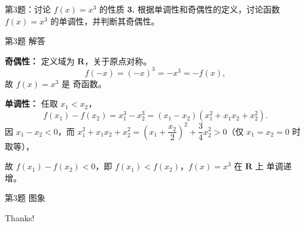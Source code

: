 \documentclass[10pt,aspectratio=169,serif]{beamer}
\begin{document}
\begin{frame}[t]{第3题：讨论 $f(x)=x^3$ 的性质}
\textbf{3.} 根据单调性和奇偶性的定义，讨论函数 $f(x)=x^3$ 的单调性，并判断其奇偶性。
\end{frame}

\begin{frame}[t]{第3题 解答}
\begin{tcolorbox}[colback=orange!10,colframe=orange,title=\textbf{解}]
\textbf{奇偶性：} 定义域为 $\mathbf{R}$，关于原点对称。
\[
f(-x)=(-x)^3=-x^3=-f(x),
\]
故 $f(x)=x^3$ 是 \alert{奇函数}。

\vspace{0.8em}
\textbf{单调性：} 任取 $x_1<x_2$，
\[
f(x_1)-f(x_2)=x_1^3-x_2^3=(x_1-x_2)(x_1^2+x_1x_2+x_2^2).
\]
因 $x_1-x_2<0$，而 $x_1^2+x_1x_2+x_2^2=\left(x_1+\dfrac{x_2}{2}\right)^2+\dfrac34x_2^2>0$（仅 $x_1=x_2=0$ 时取等），

\vspace{0.3em}
故 $f(x_1)-f(x_2)<0$，即 $f(x_1)<f(x_2)$，$f(x)=x^3$ 在 $\mathbf{R}$ 上 \alert{单调递增}。
\end{tcolorbox}
\end{frame}

\begin{frame}[t]{第3题 图象}
\begin{center}
\end{center}
\end{frame}

\begin{frame}[c]
  \begin{center}
    {\Huge\calligra Thanks!}
  \end{center}
\end{frame}
\end{document}
